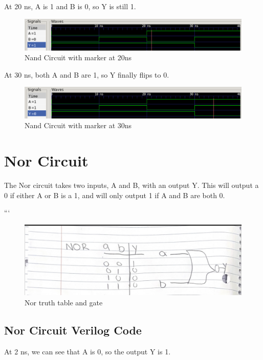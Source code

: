 \documentclass[12pt]{article}
\begin{document}
At 20 ns, A is 1 and B is 0, so Y is still 1.
\begin{figure}[H]
    \centering
    \includegraphics[width = 1.0\textwidth]{nand/nand_wave3.PNG}
    \caption{Nand Circuit with marker at 20ns}
    \label{fig:enter-label}
\end{figure}

At 30 ns, both A and B are 1, so Y finally flips to 0.
\begin{figure}[H]
    \centering
    \includegraphics[width = 1.0\textwidth]{nand/nand_wave4.PNG}
    \caption{Nand Circuit with marker at 30ns}
    \label{fig:enter-label}
\end{figure}

\section{Nor Circuit}
The Nor circuit takes two inputs, A and B, with an output Y. This will output a 0 if either A or B is a 1, and will only output 1 if A and B are both 0.

```\begin{figure}[H]
    \centering
    \includegraphics[width = 1.0\textwidth]{Truth-Tables/NorTT.PNG}
    \caption{Nor truth table and gate}
    \label{fig:shift-table}
\end{figure}

\subsection{Nor Circuit Verilog Code}
At 2 ns, we can see that  A is 0, so the output Y is 1.

\end{document}
